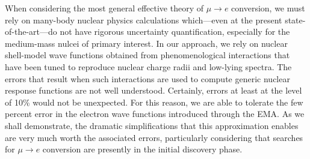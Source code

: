 \documentclass{book}[letterpaper,12pt]
\begin{document}
When considering the most general effective theory of $\mu\rightarrow e$ conversion, we must rely on many-body nuclear physics calculations which---even at the present state-of-the-art---do not have rigorous uncertainty quantification, especially for the medium-mass nulcei of primary interest. In our approach, we rely on nuclear shell-model wave functions obtained from phenomenological interactions that have been tuned to reproduce nuclear charge radii and low-lying spectra. The errors that result when such interactions are used to compute generic nuclear response functions are not well understood. Certainly, errors at least at the level of 10\% would not be unexpected. For this reason, we are able to tolerate the few percent error in the electron wave functions introduced through the EMA. As we shall demonstrate, the dramatic simplifications that this approximation enables are very much worth the associated errors, particularly considering that searches for $\mu\rightarrow e$ conversion are presently in the initial discovery phase.
\end{document}
